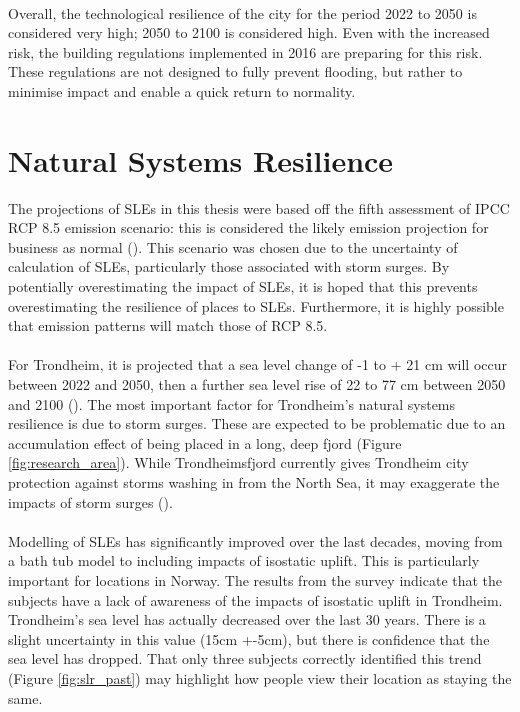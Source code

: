 \paragraph{}
Overall, the technological resilience of the city for the period 2022 to 2050 is considered very high; 2050 to 2100 is considered high. Even with the increased risk, the building regulations implemented in 2016 are preparing for this risk. These regulations are not designed to fully prevent flooding, but rather to minimise impact and enable a quick return to normality. 


\section{Natural Systems Resilience}
The projections of SLEs in this thesis were based off the fifth assessment of IPCC RCP 8.5 emission scenario: this is considered the likely emission projection for business as normal (\cite{hanssen-bauer_climate_2017}). This scenario was chosen due to the uncertainty of calculation of SLEs, particularly those associated with storm surges. By potentially overestimating the impact of SLEs, it is hoped that this prevents overestimating the resilience of places to SLEs. Furthermore, it is highly possible that emission patterns will match those of RCP 8.5. 
\paragraph{}

For Trondheim, it is projected that a sea level change of -1 to + 21 cm will occur between 2022 and 2050, then a further sea level rise of 22 to 77 cm between 2050 and 2100 (\cite{hanssen_saksframlegg_2013}). The most important factor for Trondheim's natural systems resilience is due to storm surges. These are expected to be problematic due to an accumulation effect of being placed in a long, deep fjord (Figure \ref{fig:research_area}). While Trondheimsfjord currently gives Trondheim city protection against storms washing in from the North Sea, it may exaggerate the impacts of storm surges (\cite{hanssen_saksframlegg_2013}). 
\paragraph{}
Modelling of SLEs has significantly improved over the last decades, moving from a bath tub model to including impacts of isostatic uplift. This is particularly important for locations in Norway. The results from the survey indicate that the subjects have a lack of awareness of the impacts of isostatic uplift in Trondheim. Trondheim's sea level has actually decreased over the last 30 years. There is a slight uncertainty in this value (15cm +-5cm), but there is confidence that the sea level has dropped. That only three subjects correctly identified this trend (Figure \ref{fig:slr_past}) may highlight how people view their location as staying the same.

